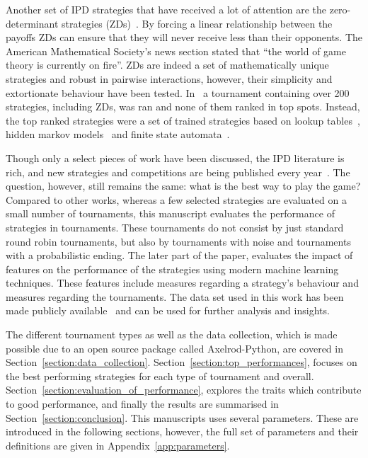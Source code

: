 \documentclass{article}
\newcommand{\numberofalltournaments}{}
\newcommand{\numberofstrategies}{}
\begin{document}
Another set of IPD strategies that have received a lot of attention
are the zero-determinant strategies (ZDs)~\cite{Press2012}. By
forcing a linear relationship between the payoffs ZDs can ensure that they will
never receive less than their opponents. The
American Mathematical Society's news section stated that ``the world of game
theory is currently on fire''.
ZDs are indeed a set of mathematically unique strategies
and robust in pairwise interactions, however, their simplicity and extortionate
behaviour have been tested. In~\cite{Harper2017} a tournament containing over
200 strategies, including ZDs, was ran and none of them
ranked in top spots. Instead, the top ranked strategies were a set of
trained strategies based on lookup tables~\cite{Axelrod1987}, hidden markov
models~\cite{Harper2017} and finite state automata~\cite{Miller1996}.

Though only a select pieces of work have been discussed, the IPD literature is
rich, and new strategies and competitions are being published every year~\cite{Glynatsi2019}. The
question, however, still remains the same: what is the best way to play the
game? Compared to other works, whereas a few selected strategies are evaluated
on a small number of tournaments, this manuscript evaluates the performance of \numberofstrategies
strategies in \numberofalltournaments tournaments. These tournaments do not
consist by just standard round robin tournaments, but also by tournaments with noise
and tournaments with a probabilistic ending. The later part of the paper, evaluates
the impact of features on the performance of the strategies using modern
machine learning techniques. These features include measures regarding a
strategy's behaviour and measures regarding the tournaments. The data set used
in this work has been made publicly available~\cite{data} and can be used
for further analysis and insights.

The different tournament types as well as the data collection, which is made
possible due to an open source package called Axelrod-Python,
are covered in Section~\ref{section:data_collection}.
Section~\ref{section:top_performances}, focuses on the best performing
strategies for each type of tournament and overall.
Section~\ref{section:evaluation_of_performance}, explores the traits which
contribute to good performance, and finally the results are summarised in
Section~\ref{section:conclusion}. This manuscripts uses several parameters.
These are introduced in the following sections, however, the full set of
parameters and their definitions are given in Appendix~\ref{app:parameters}.
\end{document}
